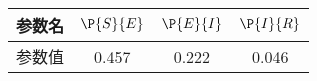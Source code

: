 \begin{tabular}{cccc}
\hline
参数名&$\P{S}{E}$&$\P{E}{I}$&$\P{I}{R}$\\
\hline
参数值&0.457&0.222&0.046\\
\hline
\end{tabular}